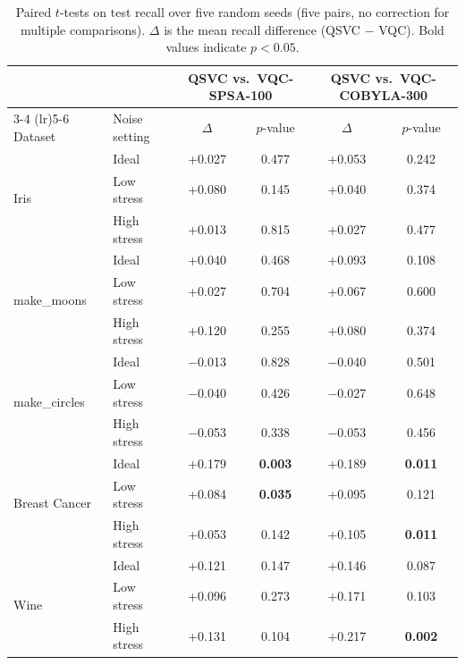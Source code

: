 \documentclass[12pt,a4paper]{article}
\newcommand{\chgcolor}{blue}
\begin{document}
\begin{table}[H]
  \centering
  \caption{Paired $t$-tests on test recall over five random seeds (five pairs, no correction for multiple comparisons). $\Delta$ is the mean recall difference (QSVC $-$ VQC). Bold values indicate $p < 0.05$.}
  \label{tab:ttest_recall}
  \footnotesize
  \setlength{\tabcolsep}{5pt}
  \renewcommand{\arraystretch}{1.2}
  {\color{\chgcolor}\begin{tabular}{llcccc}
    \toprule
    & & \multicolumn{2}{c}{QSVC vs.\ VQC-SPSA-100} & \multicolumn{2}{c}{QSVC vs.\ VQC-COBYLA-300} \\
    \cmidrule(lr){3-4} \cmidrule(lr){5-6}
    Dataset & Noise setting & $\Delta$ & $p$-value & $\Delta$ & $p$-value \\
    \midrule
    \multirow{3}{*}{Iris} & Ideal & +0.027 & 0.477 & +0.053 & 0.242 \\
  & Low stress & +0.080 & 0.145 & +0.040 & 0.374 \\
  & High stress & +0.013 & 0.815 & +0.027 & 0.477 \\
    \midrule
    \multirow{3}{*}{make\_moons} & Ideal & +0.040 & 0.468 & +0.093 & 0.108 \\
  & Low stress & +0.027 & 0.704 & +0.067 & 0.600 \\
  & High stress & +0.120 & 0.255 & +0.080 & 0.374 \\
    \midrule
    \multirow{3}{*}{make\_circles} & Ideal & $-$0.013 & 0.828 & $-$0.040 & 0.501 \\
  & Low stress & $-$0.040 & 0.426 & $-$0.027 & 0.648 \\
  & High stress & $-$0.053 & 0.338 & $-$0.053 & 0.456 \\
    \midrule
    \multirow{3}{*}{Breast Cancer} & Ideal & +0.179 & \textbf{0.003} & +0.189 & \textbf{0.011} \\
  & Low stress & +0.084 & \textbf{0.035} & +0.095 & 0.121 \\
  & High stress & +0.053 & 0.142 & +0.105 & \textbf{0.011} \\
    \midrule
    \multirow{3}{*}{Wine} & Ideal & +0.121 & 0.147 & +0.146 & 0.087 \\
  & Low stress & +0.096 & 0.273 & +0.171 & 0.103 \\
  & High stress & +0.131 & 0.104 & +0.217 & \textbf{0.002} \\
    \bottomrule
  \end{tabular}}
\end{table}
\end{document}
